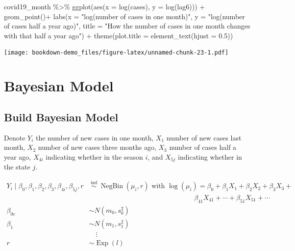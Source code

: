 \documentclass[
]{book}
\newenvironment{Shaded}{\begin{snugshade}}{\end{snugshade}}
\newcommand{\AttributeTok}[1]{\textcolor[rgb]{0.77,0.63,0.00}{#1}}
\newcommand{\FloatTok}[1]{\textcolor[rgb]{0.00,0.00,0.81}{#1}}
\newcommand{\FunctionTok}[1]{\textcolor[rgb]{0.00,0.00,0.00}{#1}}
\newcommand{\NormalTok}[1]{#1}
\newcommand{\SpecialCharTok}[1]{\textcolor[rgb]{0.00,0.00,0.00}{#1}}
\newcommand{\StringTok}[1]{\textcolor[rgb]{0.31,0.60,0.02}{#1}}
\begin{document}
\begin{Shaded}
\begin{Highlighting}[]
\NormalTok{covid19\_month }\SpecialCharTok{\%\textgreater{}\%}
  \FunctionTok{ggplot}\NormalTok{(}\FunctionTok{aes}\NormalTok{(}\AttributeTok{x =} \FunctionTok{log}\NormalTok{(cases), }\AttributeTok{y =} \FunctionTok{log}\NormalTok{(lag6))) }\SpecialCharTok{+}
  \FunctionTok{geom\_point}\NormalTok{()}\SpecialCharTok{+}
  \FunctionTok{labs}\NormalTok{(}\AttributeTok{x =} \StringTok{"log(number of cases in one month)"}\NormalTok{, }\AttributeTok{y =} \StringTok{"log(number of cases half a year ago)"}\NormalTok{, }\AttributeTok{title =} \StringTok{"How the number of cases in one month changes with that half a year ago"}\NormalTok{) }\SpecialCharTok{+}
  \FunctionTok{theme}\NormalTok{(}\AttributeTok{plot.title =} \FunctionTok{element\_text}\NormalTok{(}\AttributeTok{hjust =} \FloatTok{0.5}\NormalTok{))}
\end{Highlighting}
\end{Shaded}

\texttt{[image: bookdown-demo\_files/figure-latex/unnamed-chunk-23-1.pdf]}

\hypertarget{bayesian-model}{%
\chapter{Bayesian Model}\label{bayesian-model}}

\hypertarget{build-bayesian-model}{%
\section{Build Bayesian Model}\label{build-bayesian-model}}

Denote \(Y_i\) the number of new cases in one month, \(X_{1}\) number of new cases last month, \(X_2\) number of new cases three months ago, \(X_3\) number of cases half a year ago, \(X_{4i}\) indicating whether in the season \(i\), and \(X_{5j}\) indicating whether in the state \(j\).

\[
\begin{aligned}
Y_{i} \mid \beta_{0}, \beta_{1}, \beta_{2}, \beta_{3}, \beta_{4i}, \beta_{5j}, r & \stackrel{\text { ind }}{\sim} \operatorname{NegBin}\left(\mu_{i}, r\right) \text { with } \log \left(\mu_{i}\right)=\beta_{0}+\beta_{1} X_{1}+\beta_{2} X_{2} + \beta_3X_{3}+\\&\qquad\qquad\qquad\qquad\qquad\qquad\qquad\text{ }\text{ } \beta_{41}X_{41} +\cdots + \beta_{51}X_{51} + \cdots \\
\beta_{0 c} & \sim N\left(m_0, s_0^2\right) \\
\beta_{1} & \sim N\left(m_1, s_1^2\right) \\
&\quad\vdots\\
r & \sim \operatorname{Exp}(l)
\end{aligned}
\]
\end{document}

